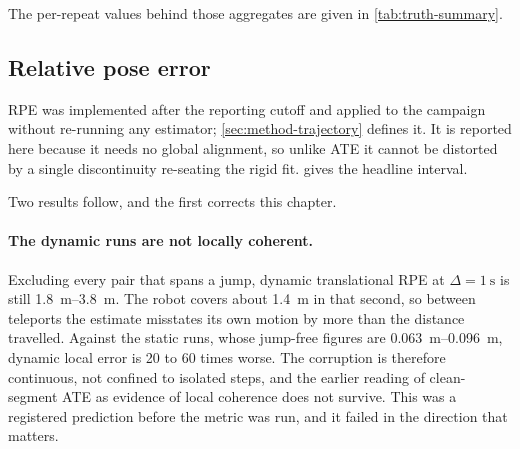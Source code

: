 The per-repeat values behind those aggregates are given in
\cref{tab:truth-summary}.

\subsection{Relative pose error}
\label{sec:rpe}

RPE was implemented after the reporting cutoff and applied to the campaign
without re-running any estimator; \cref{sec:method-trajectory} defines it. It is
reported here because it needs no global alignment, so unlike ATE it cannot be
distorted by a single discontinuity re-seating the rigid fit.
 gives the headline interval.

\begin{table}[htbp]
\centering
\caption{Relative pose error at $\Delta=\SI{1}{\second}$, median (IQR) over runs.
``Jump-free'' excludes pairs spanning a detected tracking jump; the difference
between the two columns is the teleport contribution. Requested VINS+YOLO values
are not active-filter measurements.}
\label{tab:rpe-summary}
\footnotesize
\setlength{\tabcolsep}{3pt}

\end{table}

Two results follow, and the first corrects this chapter.

\paragraph{The dynamic runs are not locally coherent.} Excluding every pair that
spans a jump, dynamic translational RPE at $\Delta=\SI{1}{\second}$ is still
\SIrange{1.8}{3.8}{\metre}. The robot covers about \SI{1.4}{\metre} in that
second, so between teleports the estimate misstates its own motion by more than
the distance travelled. Against the static runs, whose jump-free figures are
\SIrange{0.063}{0.096}{\metre}, dynamic local error is \num{20} to \num{60}
times worse. The corruption is therefore continuous, not confined to isolated
steps, and the earlier reading of clean-segment ATE as evidence of local
coherence does not survive. This was a registered prediction before the metric
was run, and it failed in the direction that matters.

\begin{table}[htbp]
\centering
\caption{Jump-free translational RPE against interval, median over runs, in
metres. ``Growth'' is the ratio from \SI{0.5}{\second} to \SI{5}{\second};
linear accumulation would give \num{10}$\times$ and a pure random walk
\num{3.2}$\times$.}
\label{tab:rpe-sweep}
\small
\setlength{\tabcolsep}{5pt}

\end{table}

